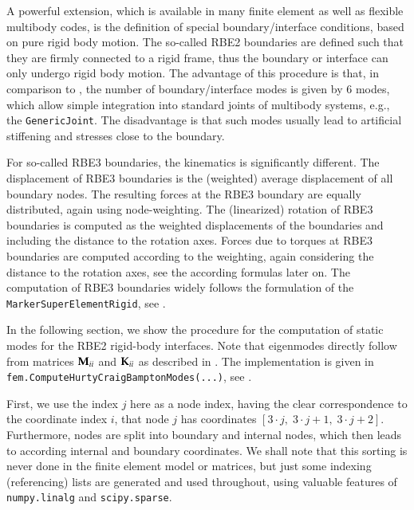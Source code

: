 A powerful extension, which is available in many finite element as well as flexible multibody codes, is the definition of special boundary/interface conditions, based on pure rigid body motion.
The so-called RBE2 boundaries are defined such that they are firmly connected to a rigid frame, thus the boundary or interface can only undergo rigid body motion.
The advantage of this procedure is that, in comparison to , the number of boundary/interface modes is given by 6  modes, which allow simple integration into standard joints of multibody systems, e.g., the \texttt{GenericJoint}.
The disadvantage is that such modes usually lead to artificial stiffening and stresses close to the boundary.

For so-called RBE3 boundaries, the kinematics is significantly different. The displacement of RBE3 boundaries is the (weighted) average displacement of all boundary nodes. The resulting forces at the RBE3 boundary are equally distributed, again using node-weighting.
The (linearized) rotation of RBE3 boundaries is computed as the weighted displacements of the boundaries and including the distance to the rotation axes. 
Forces due to torques at RBE3 boundaries are computed according to the weighting, again considering the distance to the rotation axes, see the according formulas later on. The computation of RBE3 boundaries widely follows the formulation of the \texttt{MarkerSuperElementRigid}, see .

In the following section, we show the procedure for the computation of static modes for the RBE2 rigid-body interfaces.
Note that eigenmodes directly follow from matrices $\mathbf{M}_{ii}$ and $\mathbf{K}_{ii}$ as described in .
The implementation is given in \texttt{fem.ComputeHurtyCraigBamptonModes(...)}, see .

First, we use the index $j$ here as a node index, having the clear correspondence to the coordinate index $i$, that node $j$ has coordinates 
$[3\cdot j,\; 3\cdot j+1,\; 3\cdot j+2]$.
Furthermore, nodes are split into boundary and internal nodes, which then leads to according internal and boundary coordinates.
We shall note that this sorting is never done in the finite element model or matrices, but just some indexing (referencing) lists are generated and used throughout, using valuable features of \texttt{numpy.linalg} and \texttt{scipy.sparse}.


